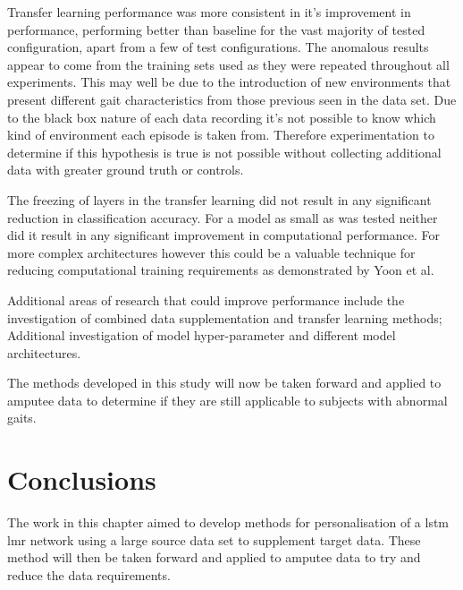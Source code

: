 Transfer learning performance was more consistent in it's improvement in performance, performing better than baseline for the vast majority of tested configuration, apart from a few of test configurations. The anomalous results appear to come from the training sets used as they were repeated throughout all experiments. This may well be due to the introduction of new environments that present different gait characteristics from those previous seen in the data set. Due to the black box nature of each data recording it's not possible to know which kind of environment each episode is taken from. Therefore experimentation to determine if this hypothesis is true is not possible without collecting additional data with greater ground truth or controls.

The freezing of layers in the transfer learning did not result in any significant reduction in classification accuracy. For a model as small as was tested neither did it result in any significant improvement in computational performance. For more complex architectures however this could be a valuable technique for reducing computational training requirements as demonstrated by Yoon et al\cite{Yoon2017}.

Additional areas of research that could improve performance include the investigation of combined data supplementation and transfer learning methods; Additional investigation of model hyper-parameter and different model architectures.

The methods developed in this study will now be taken forward and applied to amputee data to determine if they are still applicable to subjects with abnormal gaits.

\section{Conclusions}
\label{sec:personalisation-conclusions}
The work in this chapter aimed to develop methods for personalisation of a \acrshort{lstm} \acrshort{lmr} network using a large source data set to supplement target data. These method will then be taken forward and applied to amputee data to try and reduce the data requirements.

